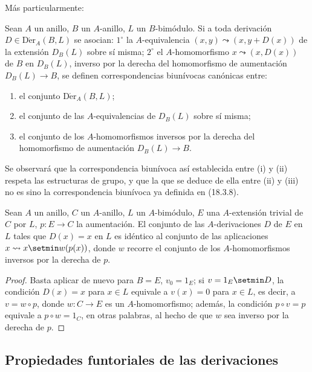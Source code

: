 Más particularmente:

\begin{corollary}[20.1.6]
\label{0.20.1.6-fr}
Sean $A$ un anillo, $B$ un $A$-anillo, $L$ un $B$-bimódulo. Si a toda
derivación $D\in\operatorname{D\acute{e}r}_A(B,L)$ se asocian: $1^\circ$ la
$A$-equivalencia $(x,y)\leadsto(x,y+D(x))$ de la extensión $D_B(L)$ sobre
sí misma; $2^\circ$ el $A$-homomorfismo $x\leadsto(x,D(x))$ de $B$ en
$D_B(L)$, inverso por la derecha del homomorfismo de aumentación $D_B(L)\to B$,
se definen correspondencias biunívocas canónicas entre:
\begin{enumerate}
  \item[\rm(i)] el conjunto $\operatorname{D\acute{e}r}_A(B,L)$;
  \item[\rm(ii)] el conjunto de las $A$-equivalencias de $D_B(L)$ sobre sí misma;
  \item[\rm(iii)] el conjunto de los $A$-homomorfismos inversos por la derecha del
  homomorfismo de aumentación $D_B(L)\to B$.
\end{enumerate}
\end{corollary}

Se observará que la correspondencia biunívoca así establecida entre (i) y (ii)
respeta las estructuras de grupo, y que la que se deduce de ella entre (ii) y
(iii) no es sino la correspondencia biunívoca ya definida en (18.3.8).

\begin{corollary}[20.1.7]
\label{0.20.1.7-fr}
Sean $A$ un anillo, $C$ un $A$-anillo, $L$ un $A$-bimódulo, $E$ una
$A$-extensión trivial de $C$ por $L$, $p:E\to C$ la aumentación. El conjunto
de las $A$-derivaciones $D$ de $E$ en $L$ tales que $D(x)=x$ en $L$ es
idéntico al conjunto de las aplicaciones $x\leadsto x\setmin w(p(x))$, donde $w$
recorre el conjunto de los $A$-homomorfismos inversos por la derecha de $p$.
\end{corollary}

\begin{proof}
Basta aplicar de nuevo  para $B=E$,
$v_0=1_E$; si $v=1_E\setmin D$, la condición $D(x)=x$ para
$x\in L$ equivale a $v(x)=0$ para $x\in L$, es decir, a $v=w\circ p$,
donde $w:C\to E$ es un $A$-homomorfismo; además, la condición
$p\circ v=p$ equivale a $p\circ w=1_C$, en otras palabras, al hecho de
que $w$ sea inverso por la derecha de $p$.
\end{proof}


\subsection{Propiedades funtoriales de las derivaciones}
\label{subsection:0.20.2-fr}


